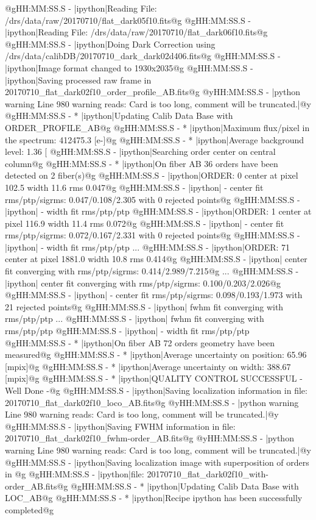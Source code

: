 \begin{cmdboxprintspecial}[fontupper=\tiny, fontlower=\tiny]
@gHH:MM:SS.S -   |ipython|Reading File: /drs/data/raw/20170710/flat_dark05f10.fits@g
@gHH:MM:SS.S -   |ipython|Reading File: /drs/data/raw/20170710/flat_dark06f10.fits@g
@gHH:MM:SS.S -   |ipython|Doing Dark Correction using /drs/data/calibDB/20170710_dark_dark02d406.fits@g
@gHH:MM:SS.S -   |ipython|Image format changed to 1930x2035@g
@gHH:MM:SS.S -   |ipython|Saving processed raw frame in 20170710_flat_dark02f10_order_profile_AB.fits@g
@yHH:MM:SS.S - \@ |python warning Line 980  warning reads: Card is too long, comment will be truncated.|@y
@gHH:MM:SS.S - * |ipython|Updating Calib Data Base with ORDER_PROFILE_AB@g
@gHH:MM:SS.S - * |ipython|Maximum flux/pixel in the spectrum: 412475.3 [e-]@g
@gHH:MM:SS.S - * |ipython|Average background level: 1.36 [%
@gHH:MM:SS.S -   |ipython|Searching order center on central column@g
@gHH:MM:SS.S - * |ipython|On fiber AB 36 orders have been detected on 2 fiber(s)@g
@gHH:MM:SS.S -   |ipython|ORDER: 0 center at pixel 102.5 width 11.6 rms 0.047@g
@gHH:MM:SS.S -   |ipython| - center fit rms/ptp/sigrms: 0.047/0.108/2.305 with 0 rejected points@g
@gHH:MM:SS.S -   |ipython| - width  fit rms/ptp/ptp%
@gHH:MM:SS.S -   |ipython|ORDER: 1 center at pixel 116.9 width 11.4 rms 0.072@g
@gHH:MM:SS.S -   |ipython| - center fit rms/ptp/sigrms: 0.072/0.167/2.331 with 0 rejected points@g
@gHH:MM:SS.S -   |ipython| - width  fit rms/ptp/ptp%
...
@gHH:MM:SS.S -   |ipython|ORDER: 71 center at pixel 1881.0 width 10.8 rms 0.414@g
@gHH:MM:SS.S -   |ipython|      center fit converging with rms/ptp/sigrms: 0.414/2.989/7.215@g
...
@gHH:MM:SS.S -   |ipython|      center fit converging with rms/ptp/sigrms: 0.100/0.203/2.026@g
@gHH:MM:SS.S -   |ipython| - center fit rms/ptp/sigrms: 0.098/0.193/1.973 with 21 rejected points@g
@gHH:MM:SS.S -   |ipython|      fwhm fit converging with rms/ptp/ptp%
...
@gHH:MM:SS.S -   |ipython|      fwhm fit converging with rms/ptp/ptp%
@gHH:MM:SS.S -   |ipython| - width  fit rms/ptp/ptp%
@gHH:MM:SS.S - * |ipython|On fiber AB 72 orders geometry have been measured@g
@gHH:MM:SS.S - * |ipython|Average uncertainty on position: 65.96 [mpix]@g
@gHH:MM:SS.S - * |ipython|Average uncertainty on width: 388.67 [mpix]@g
@gHH:MM:SS.S - * |ipython|QUALITY CONTROL SUCCESSFUL - Well Done -@g
@gHH:MM:SS.S -   |ipython|Saving localization information in file: 20170710_flat_dark02f10_loco_AB.fits@g
@yHH:MM:SS.S - \@ |python warning Line 980  warning reads: Card is too long, comment will be truncated.|@y
@gHH:MM:SS.S -   |ipython|Saving FWHM information in file: 20170710_flat_dark02f10_fwhm-order_AB.fits@g
@yHH:MM:SS.S - \@ |python warning Line 980  warning reads: Card is too long, comment will be truncated.|@y
@gHH:MM:SS.S -   |ipython|Saving localization image with superposition of orders in @g
@gHH:MM:SS.S -   |ipython|file: 20170710_flat_dark02f10_with-order_AB.fits@g
@gHH:MM:SS.S - * |ipython|Updating Calib Data Base with LOC_AB@g
@gHH:MM:SS.S - * |ipython|Recipe ipython has been successfully completed@g
\end{cmdboxprintspecial}


